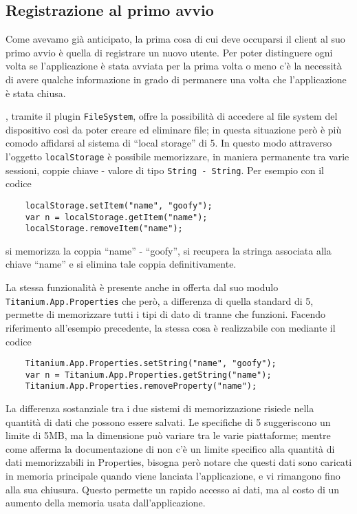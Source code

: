 			
		\subsection{Registrazione al primo avvio}
		\label{subsec:registrazione}
			Come avevamo già anticipato, la prima cosa di cui deve occuparsi
			il client al suo primo avvio è quella di registrare un nuovo utente. Per
			poter distinguere ogni volta se l'applicazione è stata avviata 
			per la prima volta o meno c'è la
			necessità di avere qualche informazione in grado di permanere una volta
			che l'applicazione è stata chiusa.
			
			\pg{}, tramite il plugin
			\texttt{FileSystem}, offre la possibilità di accedere al file system
			del dispositivo così da poter creare ed	eliminare file; in questa
			situazione però è più comodo affidarsi al sistema di ``lo\-cal stor\-age''
			di \html{}5. In questo modo attraverso l'oggetto \js{} \texttt{localStorage}
			è possibile memorizzare, in maniera permanente tra varie sessioni, coppie
			chiave - valore di tipo \texttt{String - String}. Per esempio con il
			codice
			\begin{lstlisting}
	localStorage.setItem("name", "goofy");
	var n = localStorage.getItem("name");
	localStorage.removeItem("name");
			\end{lstlisting}
			si memorizza la coppia ``name'' - ``goofy'', si recupera la stringa associata
			alla chiave ``name'' e si elimina tale coppia definitivamente.
			
			La stessa funzionalità è presente anche in \tisdk{} offerta dal suo
			modulo \texttt{Titanium.App.Properties} che però, a differenza di
			quella standard di \html{}5, permette di memorizzare tutti i tipi di
			dato di \js{} tranne che funzioni. Facendo riferimento all'esempio 
			precedente, la stessa cosa è realizzabile con \tisdk mediante il
			codice
			\begin{lstlisting}
	Titanium.App.Properties.setString("name", "goofy");
	var n = Titanium.App.Properties.getString("name");
	Titanium.App.Properties.removeProperty("name");
			\end{lstlisting}

			La differenza sostanziale tra i due sistemi di memorizzazione risiede 
			nella quantità di dati che possono essere salvati. 
			Le specifiche di \html{}5 suggeriscono un limite di 5MB, ma la dimensione 
			può variare tra le varie piattaforme; mentre come afferma la documentazione 
			di \tisdk{} non c'è un limite specifico alla quantità di dati memorizzabili
			in Properties, bisogna però notare che questi dati sono caricati in 
			memoria principale quando 
			viene lanciata l'applicazione, e vi rimangono fino alla sua chiusura.
			Questo permette un rapido accesso ai dati, ma al costo di un aumento 
			della memoria usata dall'applicazione. 
			
